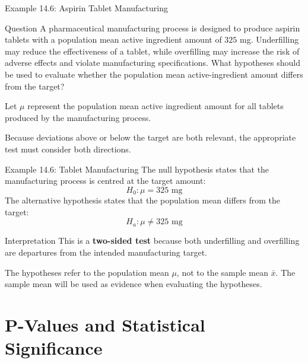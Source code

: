 \documentclass[aspectratio=169]{beamer}
\begin{document}
\begin{frame}{Example 14.6: Aspirin Tablet Manufacturing}
\begin{block}{Question}
A pharmaceutical manufacturing process is designed to produce aspirin tablets with a population mean active ingredient amount of $325$ mg. Underfilling may reduce the effectiveness of a tablet, while overfilling may increase the risk of adverse effects and violate manufacturing specifications. What hypotheses should be used to evaluate whether the population mean active-ingredient amount differs from the target?
\end{block}

\vspace{0.2cm}
Let $\mu$ represent the population mean active ingredient amount for all tablets produced by the manufacturing process.

\vspace{0.2cm}
Because deviations above or below the target are both relevant, the appropriate test must consider both directions.
\end{frame}

\begin{frame}{Example 14.6: Tablet Manufacturing}
The null hypothesis states that the manufacturing process is centred at the target amount:
$$H_0:\mu=325\text{ mg}$$
The alternative hypothesis states that the population mean differs from the target:
$$H_a:\mu\ne325\text{ mg}$$

\begin{block}{Interpretation}
This is a \textbf{two-sided test} because both underfilling and overfilling are departures from the intended manufacturing target.
\end{block}

\vspace{0.15cm}
The hypotheses refer to the population mean $\mu$, not to the sample mean $\bar{x}$. The sample mean will be used as evidence when evaluating the hypotheses.
\end{frame}


\section{P-Values and Statistical Significance}
\end{document}
